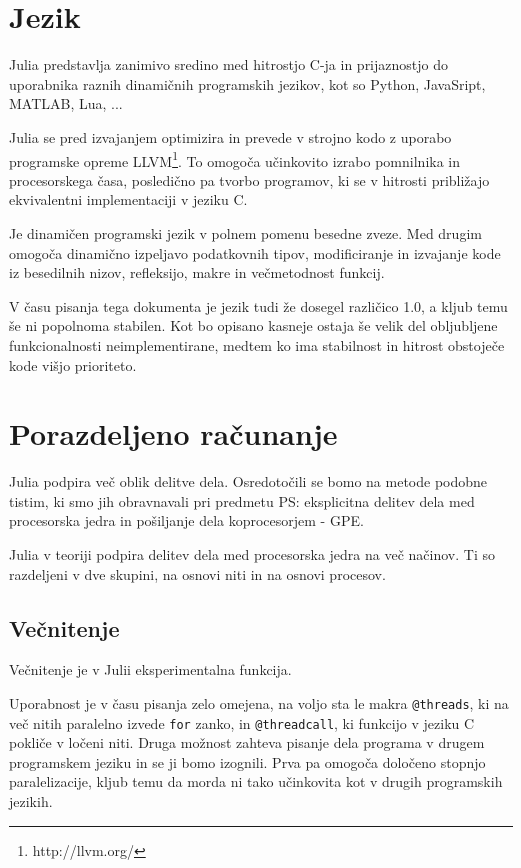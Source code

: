 \documentclass[journal,a4paper,twoside]{sty/IEEEtran}
\begin{document}
\section{Jezik}

Julia predstavlja zanimivo sredino med hitrostjo C-ja in prijaznostjo do uporabnika raznih dinamičnih programskih jezikov, kot so Python, JavaSript,
	MATLAB, Lua, ...

Julia se pred izvajanjem optimizira in prevede v strojno kodo z uporabo programske opreme LLVM\footnote{http://llvm.org/}.
To omogoča učinkovito izrabo pomnilnika in procesorskega časa, posledično pa tvorbo programov, ki se v hitrosti približajo ekvivalentni implementaciji v
	jeziku C.\cite{julia-benchmarks}

Je dinamičen programski jezik v polnem pomenu besedne zveze.
Med drugim omogoča dinamično izpeljavo podatkovnih tipov, modificiranje in izvajanje kode iz besedilnih nizov,\cite{julia-metaprogramming} refleksijo, makre in večmetodnost
	funkcij.

V času pisanja tega dokumenta je jezik tudi že dosegel različico 1.0, a kljub temu še ni popolnoma stabilen.
Kot bo opisano kasneje ostaja še velik del obljubljene funkcionalnosti neimplementirane, medtem ko ima stabilnost in hitrost obstoječe kode višjo
	prioriteto.

\section{Porazdeljeno računanje}

Julia podpira več oblik delitve dela.
Osredotočili se bomo na metode podobne tistim, ki smo jih obravnavali pri predmetu PS: eksplicitna delitev dela med procesorska jedra in pošiljanje
	dela koprocesorjem - GPE.

Julia v teoriji podpira delitev dela med procesorska jedra na več načinov.
Ti so razdeljeni v dve skupini, na osnovi niti in na osnovi procesov.

\subsection{Večnitenje}

Večnitenje je v Julii eksperimentalna funkcija.

Uporabnost je v času pisanja zelo omejena, na voljo sta le makra \texttt{@threads}, ki na več nitih paralelno izvede \texttt{for} zanko, in
	\texttt{@threadcall}, ki funkcijo v jeziku C pokliče v ločeni niti.\cite{julia-multithreading}
Druga možnost zahteva pisanje dela programa v drugem programskem jeziku in se ji bomo izognili.
Prva pa omogoča določeno stopnjo paralelizacije, kljub temu da morda ni tako učinkovita kot v drugih programskih jezikih.
\end{document}
